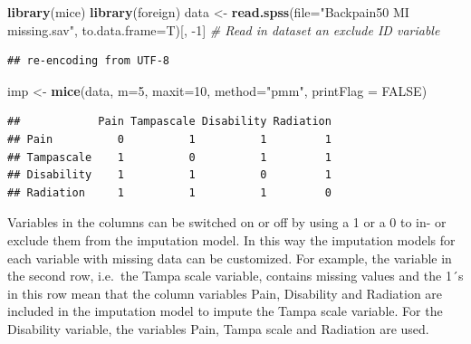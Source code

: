 \documentclass[
]{book}
\newenvironment{Shaded}{\begin{snugshade}}{\end{snugshade}}
\newcommand{\CommentTok}[1]{\textcolor[rgb]{0.56,0.35,0.01}{\textit{#1}}}
\newcommand{\DataTypeTok}[1]{\textcolor[rgb]{0.13,0.29,0.53}{#1}}
\newcommand{\DecValTok}[1]{\textcolor[rgb]{0.00,0.00,0.81}{#1}}
\newcommand{\KeywordTok}[1]{\textcolor[rgb]{0.13,0.29,0.53}{\textbf{#1}}}
\newcommand{\NormalTok}[1]{#1}
\newcommand{\OperatorTok}[1]{\textcolor[rgb]{0.81,0.36,0.00}{\textbf{#1}}}
\newcommand{\OtherTok}[1]{\textcolor[rgb]{0.56,0.35,0.01}{#1}}
\newcommand{\StringTok}[1]{\textcolor[rgb]{0.31,0.60,0.02}{#1}}
\begin{document}
\begin{Shaded}
\begin{Highlighting}[]
\KeywordTok{library}\NormalTok{(mice)}
\KeywordTok{library}\NormalTok{(foreign)}
\NormalTok{data <-}\StringTok{ }\KeywordTok{read.spss}\NormalTok{(}\DataTypeTok{file=}\StringTok{"Backpain50 MI missing.sav"}\NormalTok{, }\DataTypeTok{to.data.frame=}\NormalTok{T)[, }\DecValTok{-1}\NormalTok{] }\CommentTok{# Read in dataset an exclude ID variable}
\end{Highlighting}
\end{Shaded}

\begin{verbatim}
## re-encoding from UTF-8
\end{verbatim}

\begin{Shaded}
\begin{Highlighting}[]
\NormalTok{imp <-}\StringTok{ }\KeywordTok{mice}\NormalTok{(data, }\DataTypeTok{m=}\DecValTok{5}\NormalTok{, }\DataTypeTok{maxit=}\DecValTok{10}\NormalTok{, }\DataTypeTok{method=}\StringTok{"pmm"}\NormalTok{, }\DataTypeTok{printFlag =} \OtherTok{FALSE}\NormalTok{)}
\end{Highlighting}
\end{Shaded}

\begin{Shaded}
\end{Shaded}

\begin{verbatim}
##            Pain Tampascale Disability Radiation
## Pain          0          1          1         1
## Tampascale    1          0          1         1
## Disability    1          1          0         1
## Radiation     1          1          1         0
\end{verbatim}

Variables in the columns can be switched on or off by using a 1 or a 0 to in- or exclude them from the imputation model. In this way the imputation models for each variable with missing data can be customized. For example, the variable in the second row, i.e.~the Tampa scale variable, contains missing values and the 1´s in this row mean that the column variables Pain, Disability and Radiation are included in the imputation model to impute the Tampa scale variable. For the Disability variable, the variables Pain, Tampa scale and Radiation are used.
\end{document}
